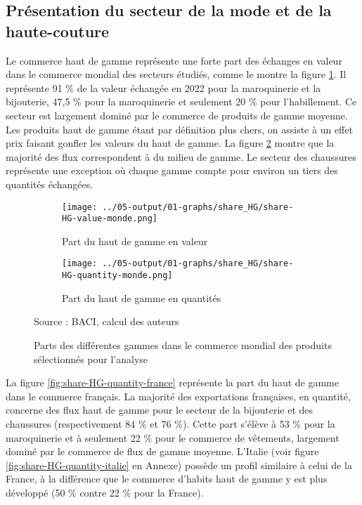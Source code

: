 \documentclass[french,10pt,a4paper]{article}
\begin{document}
\subsection{Présentation du secteur de la mode et de la haute-couture}

Le commerce haut de gamme représente une forte part des échanges en valeur dans le commerce mondial des secteurs étudiés, comme le montre la figure \ref{fig:share-HG-value-monde}. Il représente 91 \% de la valeur échangée en 2022 pour la maroquinerie et la bijouterie, 47,5 \% pour la maroquinerie et seulement 20 \% pour l'habillement. Ce secteur est largement dominé par le commerce de produits de gamme moyenne. Les produits haut de gamme étant par définition plus chers, on assiste à un effet prix faisant gonfler les valeurs du haut de gamme. La figure \ref{fig:share-HG-quantity-monde} montre que la majorité des flux correspondent à du milieu de gamme. Le secteur des chaussures représente une exception où chaque gamme compte pour environ un tiers des quantités échangées.

\begin{figure}[!h]
  \centering
  \begin{subfigure}{\textwidth}
    \centering    
    \texttt{[image: ../05-output/01-graphs/share\_HG/share-HG-value-monde.png]}
    \caption{Part du haut de gamme en valeur}
    \label{fig:share-HG-value-monde}
  \end{subfigure}
  \vspace{0.5cm}
  \begin{subfigure}{\textwidth}
    \centering
 \texttt{[image: ../05-output/01-graphs/share\_HG/share-HG-quantity-monde.png]}
 \caption{Part du haut de gamme en quantités}
 \label{fig:share-HG-quantity-monde}
\end{subfigure}
\captionsetup{justification=raggedright,singlelinecheck=false, font=small}
  \caption*{Source : BACI, calcul des auteurs}
  \captionsetup{justification=centering, singlelinecheck=true, font=normalsize}
  \caption{Parts des différentes gammes dans le commerce mondial des produits sélectionnés pour l'analyse}
  \label{fig:share-HG-value-quantity-monde}
\end{figure}

\bigskip

La figure \ref{fig:share-HG-quantity-france} représente la part du haut de gamme dans le commerce français. La majorité des exportations françaises, en quantité, concerne des flux haut de gamme pour le secteur de la bijouterie et des chaussures (respectivement 84 \% et 76 \%). Cette part s'élève à 53 \% pour la maroquinerie et à seulement 22 \% pour le commerce de vêtements, largement dominé par le commerce de flux de gamme moyenne. L'Italie (voir figure \ref{fig:share-HG-quantity-italie} en Annexe)  possède un profil similaire à celui de la France, à la différence que le commerce d'habits haut de gamme y est plus développé (50 \% contre 22 \% pour la France).
\end{document}
